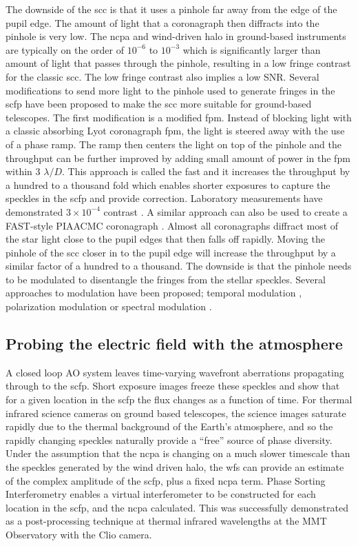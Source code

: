\documentclass[letterpaper]{ar-1col}
\newcommand{\ld}{$\lambda/D$}
\begin{document}
The downside of the \ac{scc} is that it uses a pinhole far away from the edge of the pupil edge.
%
The amount of light that a coronagraph then diffracts into the pinhole is very low.
%
The \ac{ncpa} and wind-driven halo in ground-based instruments are typically on the order of $10^{-6}$ to $10^{-3}$ which is significantly larger than amount of light that passes through the pinhole, resulting in a low fringe contrast for the classic \ac{scc}.
%
The low fringe contrast also implies a low SNR.
%
Several modifications to send more light to the pinhole used to generate fringes in the \ac{scfp} have been proposed to make the \ac{scc} more suitable for ground-based telescopes.
%
The first modification is a modified \ac{fpm}.
%
Instead of blocking light with a classic absorbing Lyot coronagraph \ac{fpm}, the light is steered away with the use of a phase ramp.
%
The ramp then centers the light on top of the pinhole and the throughput can be further improved by adding small amount of power in the \ac{fpm} within 3 \ld{}.
%
This approach is called the \acl{fast} \citep[\acs{fast}; ][]{Gerard18} and it increases the throughput by a hundred to a thousand fold which enables shorter exposures to capture the speckles in the \ac{scfp} and provide correction.
%
Laboratory measurements have demonstrated $3\times 10^{-4}$ contrast \citep{Gerard22}.
%
A similar approach can also be used to create a FAST-style PIAACMC coronagraph \citep{Haffert23a}.
%
Almost all coronagraphs diffract most of the star light close to the pupil edges that then falls off rapidly.
%
Moving the pinhole of the \ac{scc} closer in to the pupil edge will increase the throughput by a similar factor of a hundred to a thousand.
%
The downside is that the pinhole needs to be modulated to disentangle the fringes from the stellar speckles.
%
Several approaches to modulation have been proposed; temporal modulation \citep{martinez2019fast}, polarization modulation \citep{bos2021polarization} or spectral modulation \citep{Haffert22a}.

\subsection{Probing the electric field with the atmosphere}
A closed loop AO system leaves time-varying wavefront aberrations propagating through to the \ac{scfp}.
%
Short exposure images freeze these speckles and show that for a given location in the \ac{scfp} the flux changes as a function of time.
%
For thermal infrared science cameras on ground based telescopes, the science images saturate rapidly due to the thermal background of the Earth's atmosphere, and so the rapidly changing speckles naturally provide a ``free'' source of phase diversity.
%
Under the assumption that the \ac{ncpa} is changing on a much slower timescale than the speckles generated by the wind driven halo, the \ac{wfs} can provide an estimate of the complex amplitude of the \ac{scfp}, plus a fixed \ac{ncpa} term.
%
Phase Sorting Interferometry \citep[PSI; ][]{Codona13} enables a virtual interferometer to be constructed for each location in the \ac{scfp}, and the \ac{ncpa} calculated.
%
This was successfully demonstrated as a post-processing technique at thermal infrared wavelengths at the MMT Observatory with the Clio camera.
\end{document}
